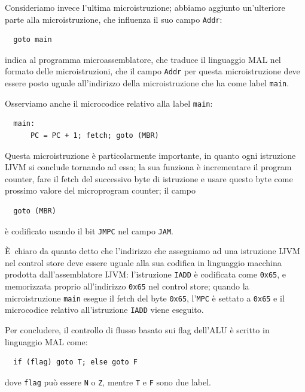 \documentclass[a4paper,12pt]{scrreprt}
\begin{document}
Consideriamo invece l'ultima microistruzione; abbiamo aggiunto un'ulteriore
parte alla microistruzione, che influenza il suo campo \lstinline{Addr}:

\begin{lstlisting}
  goto main
\end{lstlisting}

indica al programma microassemblatore, che traduce il linguaggio MAL nel formato
delle microistruzioni, che il campo \lstinline{Addr} per questa microistruzione
deve essere posto uguale all'indirizzo della microistruzione che ha come label
\lstinline{main}.

Osserviamo anche il microcodice relativo alla label \lstinline{main}:

\begin{lstlisting}
  main:
      PC = PC + 1; fetch; goto (MBR)
\end{lstlisting}

Questa microistruzione è particolarmente importante, in quanto ogni istruzione
IJVM si conclude tornando ad essa; la sua funziona è incrementare il program
counter, fare il fetch del successivo byte di istruzione e usare questo byte
come prossimo valore del microprogram counter; il campo

\begin{lstlisting}
  goto (MBR)
\end{lstlisting}

è codificato usando il bit \lstinline{JMPC} nel campo \lstinline{JAM}.

È chiaro da quanto detto che l'indirizzo che assegniamo ad una istruzione IJVM
nel control store deve essere uguale alla sua codifica in linguaggio macchina
prodotta dall'assemblatore IJVM: l'istruzione \lstinline{IADD} è codificata come
\lstinline{0x65}, e memorizzata proprio all'indirizzo \lstinline{0x65} nel
control store; quando la microistruzione \lstinline{main} esegue il fetch del
byte \lstinline{0x65}, l'\lstinline{MPC} è settato a \lstinline{0x65} e il
microcodice relativo all'istruzione \lstinline{IADD} viene eseguito.

Per concludere, il controllo di flusso basato sui flag dell'ALU è scritto in
linguaggio MAL come:

\begin{lstlisting}
  if (flag) goto T; else goto F
\end{lstlisting}

dove \lstinline{flag} può essere \lstinline{N} o \lstinline{Z}, mentre
\lstinline{T} e \lstinline{F} sono due label.
\end{document}
